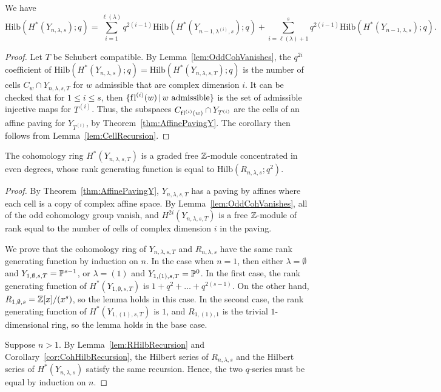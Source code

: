 \documentclass[12pt]{amsart}
\newcommand{\st}{\,|\,}
\newcommand{\Hilb}{\mathrm{Hilb}}
\newcommand{\la}{\lambda}
\newcommand{\fl}{\mathrm{f\hspace{0.25pt}l}}
\begin{document}
\begin{corollary}\label{cor:CohHilbRecursion}
We have
\[
\Hilb(H^*(Y_{n,\la,s});q) = \sum_{i=1}^{\ell(\la)} q^{2(i-1)} \Hilb(H^*(Y_{n-1,\la^{(i)},s});q) + \sum_{i=\ell(\la)+1}^s q^{2(i-1)} \Hilb(H^*(Y_{n-1,\la,s});q).
\]
\end{corollary}

\begin{proof}
Let $T$ be Schubert compatible. By Lemma~\ref{lem:OddCohVanishes}, the $q^{2i}$ coefficient of $\Hilb(H^*(Y_{n,\la,s});q)=\Hilb(H^*(Y_{n,\la,s,T});q)$ is the number of cells $C_w\cap Y_{n,\la,s,T}$ for $w$ admissible that are complex dimension $i$. It can be checked that for $1\leq i\leq s$, then $\{\fl^{(i)}(w) \st w\text{ admissible}\}$ is the set of admissible injective maps for $T^{(i)}$. Thus, the subspaces $C_{\fl^{(i)}(w)}\cap Y_{T^{(i)}}$ are the cells of an affine paving for $Y_{T^{(i)}}$, by Theorem~\ref{thm:AffinePavingY}.  The corollary then follows from Lemma~\ref{lem:CellRecursion}.
\end{proof}

\begin{corollary}\label{cor:RankGenNLaS}
The cohomology ring $H^*(Y_{n,\la,s,T})$ is a graded free $\mathbb{Z}$-module concentrated in even degrees, whose rank generating function is equal to $\Hilb(R_{n,\la,s};q^2)$.
\end{corollary}
\begin{proof}
By Theorem~\ref{thm:AffinePavingY}, $Y_{n,\la,s,T}$ has a paving by affines where each cell is a copy of complex affine space. By Lemma~\ref{lem:OddCohVanishes}, all of the odd cohomology group vanish, and $H^{2i}(Y_{n,\la,s,T})$ is a free $\mathbb{Z}$-module of rank equal to the number of cells of complex dimension $i$ in the paving.

We prove that the cohomology ring of $Y_{n,\la,s,T}$ and $R_{n,\la,s}$ have the same rank generating function by induction on $n$. In the case when $n=1$, then either $\la = \emptyset$ and $Y_{1,\emptyset,s,T} = \mathbb{P}^{s-1}$, or $\la = (1)$ and $Y_{1,(1),s,T} = \mathbb{P}^0$. In the first case, the rank generating function of $H^*(Y_{1,\emptyset,s,T})$ is $1 + q^2 +\dots + q^{2(s-1)}$. On the other hand, $R_{1,\emptyset,s} = \mathbb{Z}[x]/(x^s)$, so the lemma holds in this case. In the second case, the rank generating function of $H^*(Y_{1,(1),s,T})$ is $1$, and $R_{1,(1),1}$ is the trivial $1$-dimensional ring, so the lemma holds in the base case.

Suppose $n>1$. By Lemma~\ref{lem:RHilbRecursion} and Corollary~\ref{cor:CohHilbRecursion}, the Hilbert series of $R_{n,\la,s}$ and the Hilbert series of $H^*(Y_{n,\lambda,s})$ satisfy the same recursion. Hence, the two $q$-series must be equal by induction on $n$. 
\end{proof}
\end{document}
